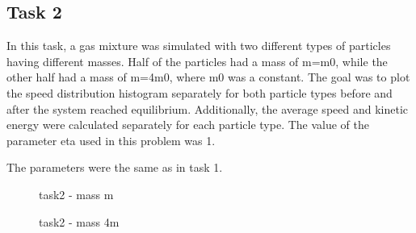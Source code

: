 \subsection{Task 2}
In this task, a gas mixture was simulated with 
two different types of particles having different 
masses. Half of the particles had a mass of m=m0, 
while the other half had a mass of m=4m0, where m0 was a 
constant. The goal was to plot the speed distribution 
histogram separately for both particle types before and 
after the system reached equilibrium. Additionally, 
the average speed and kinetic energy were calculated 
separately for each particle type. The value of the parameter 
eta used in this problem was 1.

The parameters were the same as in task 1. 

\begin{figure}[ht]
    \centering
    \caption{task2 - mass m}
\end{figure}
 


\begin{figure}[ht]
    \centering
    \caption{task2 - mass 4m }
\end{figure}


